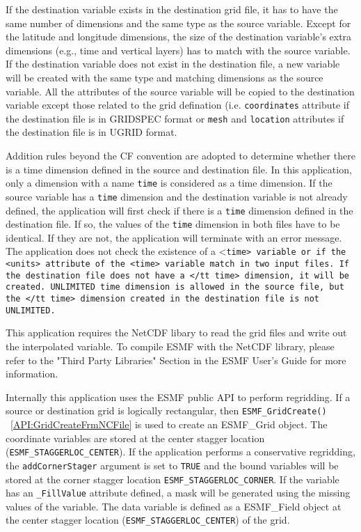 If the destination 
variable exists in the destination grid file, it has to have the same number of dimensions and the same type as the source variable. Except for the latitude and longitude dimensions, the size of 
the destination variable's extra dimensions (e.g., time and vertical layers) has to match with the 
source variable.   If the destination variable does not exist in the destination file, a 
new variable will be created with the same type and matching dimensions as the source variable. 
All the attributes of the source variable will be copied to the destination variable except those
related to the grid defination (i.e. {\tt coordinates} attribute if the destination file is in  
GRIDSPEC format or {\tt mesh} and {\tt location} attributes if the destination file is in UGRID format.

Addition rules beyond the CF convention are adopted to determine whether there is a time dimension defined
in the source and destination file.  In this application, only a dimension with a name {\tt time} is 
considered as a time dimension.
If the source variable has a {\tt time} dimension and the destination variable is not already defined, 
the application will first check if there is a {\tt time} dimension defined in the destination file.  If so, 
the values of the {\tt time} dimension in both files have to be identical.  If they are not, the application
will terminate with an error message.  The application does not check the existence of a <\tt time> variable 
or if the <\tt units> attribute of the <\tt time> variable match in two input files.  If the destination 
file does not have a </tt time> dimension, it will be created.  UNLIMITED time dimension is allowed in the
source file, but the </tt time> dimension created in the destination file is not UNLIMITED.

This application requires the NetCDF libary to read the grid files and write out the interpolated variable.  To compile ESMF with
the NetCDF library, please refer to the "Third Party Libraries" Section in the ESMF User's Guide for more information.

Internally this application uses the ESMF public API to perform regridding.
If a source or destination grid is logically rectangular, then {\tt ESMF\_GridCreate()}
~\ref{API:GridCreateFrmNCFile} is used to create an ESMF\_Grid object. The coordinate variables are stored
at the center stagger location ({\tt ESMF\_STAGGERLOC\_CENTER}).  If the application performs a 
conservative regridding, the {\tt addCornerStager} argument is set to {\tt TRUE} and the bound variables will
be stored at the corner stagger location {\tt ESMF\_STAGGERLOC\_CORNER}.  If the variable has an {\tt \_FillValue} attribute defined, a mask will be generated using the missing values of the variable. 
The data variable is defined as a ESMF\_Field object at the center stagger location ({\tt ESMF\_STAGGERLOC\_CENTER}) of the grid.   

